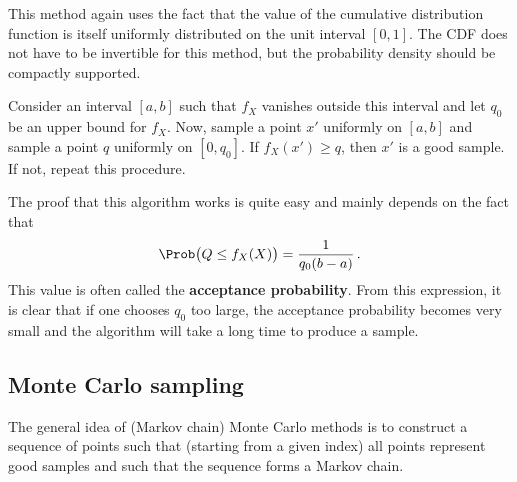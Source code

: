     This method again uses the fact that the value of the cumulative distribution function is itself uniformly distributed on the unit interval $[0,1]$. The CDF does not have to be invertible for this method, but the probability density should be compactly supported.

    \begin{method}
        Consider an interval $[a,b]$ such that $f_X$ vanishes outside this interval and let $q_0$ be an upper bound for $f_X$. Now, sample a point $x'$ uniformly on $[a,b]$ and sample a point $q$ uniformly on $[0,q_0]$. If $f_X(x')\geq q$, then $x'$ is a good sample. If not, repeat this procedure.
    \end{method}

    The proof that this algorithm works is quite easy and mainly depends on the fact that
    \begin{gather}
        \Prob\bigl(Q\leq f_X(X)\bigr)=\frac{1}{q_0(b-a)}\,.
    \end{gather}
    This value is often called the \textbf{acceptance probability}. From this expression, it is clear that if one chooses $q_0$ too large, the acceptance probability becomes very small and the algorithm will take a long time to produce a sample.

\subsection{Monte Carlo sampling}

    The general idea of (Markov chain) Monte Carlo methods is to construct a sequence of points such that (starting from a given index) all points represent good samples and such that the sequence forms a Markov chain.

